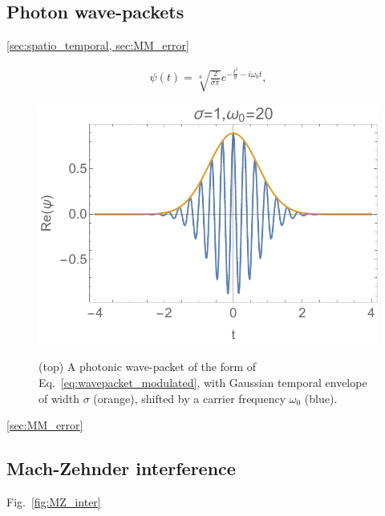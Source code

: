 \documentclass[aps,rmp,twocolumn,amsmath,amssymb,nofootinbib,superscriptaddress,longbibliography,floatfix,table-of-contents,eqsecnum]{revtex4-1}
\newcommand{\comment}[1]{{\color{blue}{\textbf{#1}}}}
\begin{document}
%
%

\subsection{Photon wave-packets} 

\ref{sec:spatio_temporal, sec:MM_error}

\begin{align} \label{eq:wavepacket_modulated}
\psi(t) = \sqrt[4]{\frac{2}{\sigma\pi}}e^{-\frac{t^2}{\sigma}-i\omega_0t},
\end{align}

\begin{figure}[!htb]
	\includegraphics[width=\columnwidth]{wavepacket} \\
	\caption{(top) A photonic wave-packet of the form of Eq.~\ref{eq:wavepacket_modulated}, with Gaussian temporal envelope of width $\sigma$ (orange), shifted by a carrier frequency $\omega_0$ (blue).} \label{fig:HOM_vs_MZ}
\end{figure}

\ref{sec:MM_error}

\comment{MZ vs HOM}

%
%

\subsection{Mach-Zehnder interference} 

Fig.~\ref{fig:MZ_inter}
\end{document}
